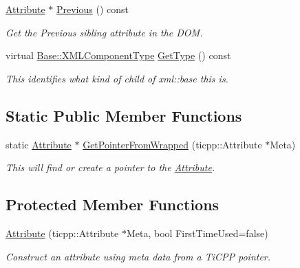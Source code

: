 \begin{DoxyCompactItemize}
\hyperlink{classphys_1_1xml_1_1Attribute}{Attribute} $\ast$ \hyperlink{classphys_1_1xml_1_1Attribute_a55c1309913e9f2e3f3fc0fa5b15d77ec}{Previous} () const 
\begin{DoxyCompactList}\small\item\em Get the Previous sibling attribute in the DOM. \item\end{DoxyCompactList}\item 
virtual \hyperlink{classphys_1_1xml_1_1Base_a62ba0484b5ecb502f9ae9d82d3720320}{Base::XMLComponentType} \hyperlink{classphys_1_1xml_1_1Attribute_a033a19965fcfbdc62026ffa4f1d26caf}{GetType} () const 
\begin{DoxyCompactList}\small\item\em This identifies what kind of child of xml::base this is. \item\end{DoxyCompactList}\end{DoxyCompactItemize}
\subsection*{Static Public Member Functions}
\begin{DoxyCompactItemize}
\item 
static \hyperlink{classphys_1_1xml_1_1Attribute}{Attribute} $\ast$ \hyperlink{classphys_1_1xml_1_1Attribute_a39274b6b439efa4ef53dceb5d6e06268}{GetPointerFromWrapped} (ticpp::Attribute $\ast$Meta)
\begin{DoxyCompactList}\small\item\em This will find or create a pointer to the \hyperlink{classphys_1_1xml_1_1Attribute}{Attribute}. \item\end{DoxyCompactList}\end{DoxyCompactItemize}
\subsection*{Protected Member Functions}
\begin{DoxyCompactItemize}
\item 
\hyperlink{classphys_1_1xml_1_1Attribute_ad3b3958d942fd233924a1c4fe8ad9cd0}{Attribute} (ticpp::Attribute $\ast$Meta, bool FirstTimeUsed=false)
\begin{DoxyCompactList}\small\item\em Construct an attribute using meta data from a TiCPP pointer. \item\end{DoxyCompactList}\end{DoxyCompactItemize}



